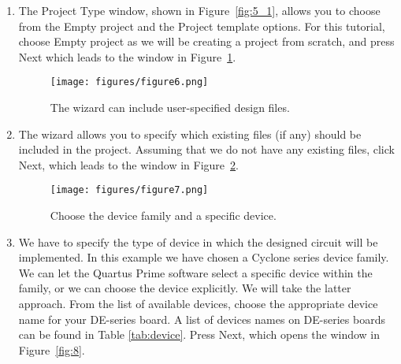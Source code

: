 \begin{enumerate}
\item The {\sf Project Type} window, shown in Figure~\ref{fig:5_1}, allows you to choose from
the {\sf Empty project} and the {\sf Project template} options. For this tutorial, 
choose {\sf Empty project} as we will be creating a project from scratch, and press 
{\sf Next} which leads to the window in Figure~\ref{fig:6}. 

\begin{figure}[H]
   \begin{center}
      \texttt{[image: figures/figure6.png]}
   \caption{The wizard can include user-specified design files.} 
	 \label{fig:6}
	 \end{center}
\end{figure}

\item The wizard allows you to specify which existing files (if any) should be included in 
the project.  Assuming that we do not have any existing files, click {\sf Next}, which leads
to the window in Figure~\ref{fig:7}.

\begin{figure}[H]
   \begin{center}
      \texttt{[image: figures/figure7.png]}
   \caption{Choose the device family and a specific device.} 
	 \label{fig:7}
	 \end{center}
\end{figure}

\item We have to specify the type of device in which the designed circuit will 
be implemented.  In this example we have chosen a 
Cyclone\textsuperscript{\textregistered} series device family.
We can let the Quartus Prime software select a specific device within the family, 
or we can choose the device explicitly.  We will take the latter approach. 
From the list of available devices, choose the appropriate device name for your DE-series board. A list of devices names on DE-series boards can be found in Table \ref{tab:device}. 
Press {\sf Next}, which opens the window in Figure~\ref{fig:8}.
 

\end{enumerate}
